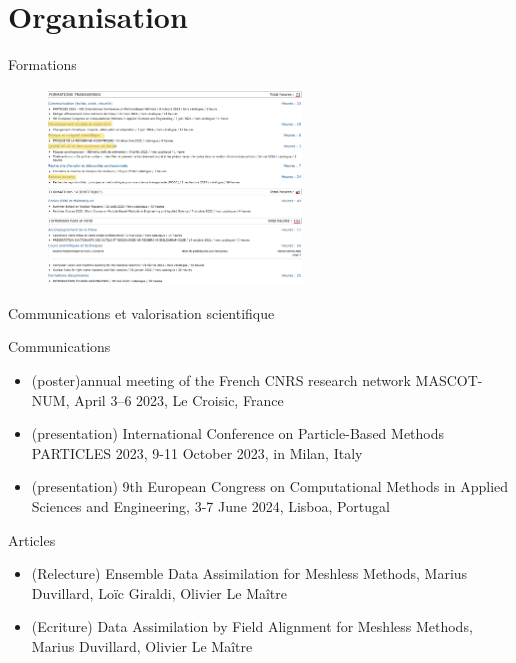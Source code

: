 \documentclass[aspectratio=169]{beamer} %
\begin{document}
\section{Organisation}
\begin{frame}{Formations}
    \begin{figure}
        \includegraphics[width=0.6\textwidth]{image/formations_annot.png}
    \end{figure}
\end{frame}

\begin{frame}{Communications et valorisation scientifique}
    \begin{block}{Communications}
        \begin{itemize}
            \item (poster)annual meeting of the French CNRS research network MASCOT-NUM, April 3–6 2023, Le Croisic, France
            \item (presentation) International Conference on Particle-Based Methods PARTICLES 2023, 9-11 October 2023, in Milan, Italy
            \item (presentation) 9th European Congress on Computational Methods in Applied Sciences and Engineering, 3-7 June 2024, Lisboa, Portugal
        \end{itemize}
    \end{block}

    \begin{block}{Articles}
        \begin{itemize}
            \item (Relecture) Ensemble Data Assimilation for Meshless Methods, Marius Duvillard, Loïc Giraldi, Olivier Le Maître
            \item (Ecriture) Data Assimilation by Field Alignment for Meshless Methods, Marius Duvillard, Olivier Le Maître
        \end{itemize}
    \end{block}

\end{frame}
\end{document}
